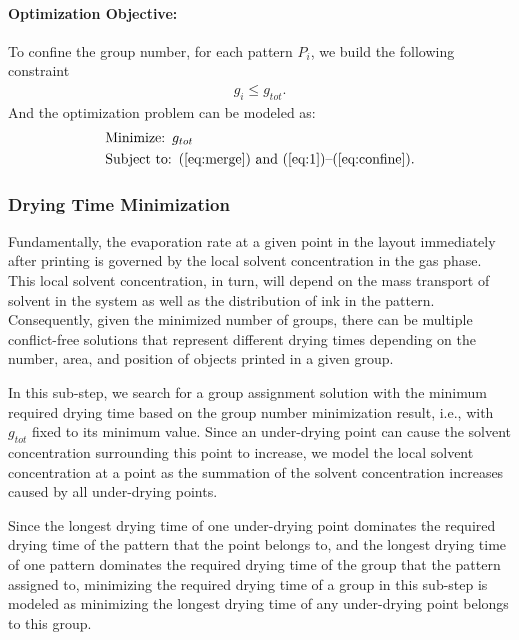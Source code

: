 \paragraph{Optimization Objective: }

To confine the group number, for each pattern $P_i$, we build the following constraint
\begin{align}
g_i \leq g_{tot}. \label{eq:confine}
\end{align}
And the optimization problem can be modeled as:
\begin{align}
&\text{Minimize:}   \hskip 5pt g_{tot} \nonumber \\
&\text{Subject to:} \hskip 5pt \text{(\ref{eq:merge}) and (\ref{eq:1})--(\ref{eq:confine}).} \nonumber
\end{align}

\subsubsection{Drying Time Minimization}

Fundamentally, the evaporation rate at a given point in the layout immediately after printing
is governed by the local solvent concentration in the gas phase. 
This local solvent concentration,
in turn, will depend on the mass transport of solvent in the system as well as the distribution of
ink in the pattern.
Consequently, given the minimized number of groups,
there can be multiple conflict-free solutions that represent different drying times depending on the number,
area, and position of objects printed in a given group.

In this sub-step,
we search for a group assignment solution with the minimum required drying time based on the group number minimization result,
i.e., with $g_{tot}$ fixed to its minimum value.
Since an under-drying point can cause the solvent concentration surrounding this point to increase,
we model the local solvent concentration at a point as the summation of the solvent concentration increases caused by all under-drying points.

Since the longest drying time of one under-drying point dominates the required drying time of the pattern that the point belongs to,
and the longest drying time of one pattern dominates the required drying time of the group that the pattern assigned to,
minimizing the required drying time of a group in this sub-step is modeled as minimizing the longest drying time of any under-drying point belongs to this group.

